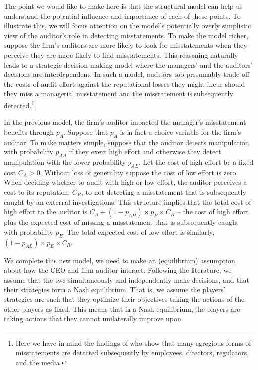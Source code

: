 The point we would like to make here is that the structural model can help us understand the potential influence and importance of each of these points. 
To illustrate this, we will focus attention on the model's potentially overly simplistic view of the auditor's role in detecting misstatements.  
To make the model richer, suppose the firm's  auditors are more likely to look for misstatements when they perceive they are more likely to find misstatements. 
This reasoning naturally
leads to a strategic decision making model where the managers' and the auditors' decisions are interdependent.
In such a model, auditors too presumably trade off the costs of audit effort against the reputational losses they might incur should they miss a managerial misstatement and the misstatement is subsequently detected.\footnote{
Here we have in mind the findings of \citet{Dyck:2010kh} who show that many egregious forms of misstatements are detected subsequently by employees, directors, regulators, and the media.} 

In the previous model, the firm's auditor impacted the manager's misstatement benefits through $p_A$. 
Suppose that $p_A$ is in fact a choice variable for the firm's auditor. 
To make matters simple, suppose that the auditor detects manipulation with probability $p_{AH}$ if they exert high effort and  otherwise they detect manipulation with the lower probability $p_{AL}$. 
Let the cost of high effort be a fixed cost $C_A > 0$. 
Without loss of generality suppose the cost of low effort is zero. 
When deciding whether to audit with high or low effort, the auditor perceives a cost to its reputation, $C_R$, to not detecting a misstatement that is subsequently caught by an external investigations. 
This structure implies that the total cost of high effort to the auditor is $C_A + (1-p_{AH}) \times p_E \times C_R$ -- the cost of high effort plus the expected cost of missing a misstatement that is subsequently caught with probability $p_E$. 
The total expected cost of
low effort is similarly, $(1-p_{AL}) \times p_E \times C_R$. 

We complete this new model, we need to make an (equilibrium) assumption about how the CEO and firm auditor interact. Following the literature, we assume that the two simultaneously
and independently make decisions, and that their strategies form a Nash equilibrium.
That is, we assume the players' strategies are such that they optimize their objectives 
taking the actions of the other players as fixed. This means that in a Nash equilibrium, 
the players are taking actions that they cannot unilaterally improve upon.

